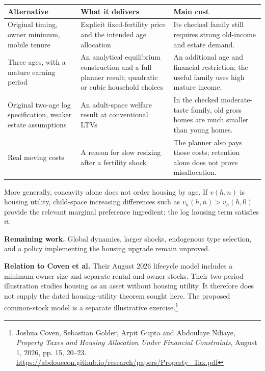 \documentclass[11pt]{article}
\begin{document}
\small
\begin{tabular}{p{}p{}p{}}
\toprule
Alternative & What it delivers & Main cost \\
\midrule
Original timing, owner minimum, mobile tenure
& Explicit fixed-fertility price and the intended age allocation
& Its checked family still requires strong old-income and estate demand. \\[6pt]
Three ages, with a mature earning period
& An analytical equilibrium construction and a full planner result; quadratic or cubic household choices
& An additional age and financial restriction; the useful family uses high mature income. \\[6pt]
Original two-age log specification, weaker estate assumptions
& An adult-space welfare result at conventional LTVs
& In the checked moderate-taste family, old gross homes are much smaller than young homes. \\[6pt]
Real moving costs
& A reason for slow resizing after a fertility shock
& The planner also pays those costs; retention alone does not prove misallocation. \\
\bottomrule
\end{tabular}
\normalsize

More generally, concavity alone does not order housing by age. If $v(h,n)$ is
housing utility, child-space increasing differences such as
$v_h(h,n)>v_h(h,0)$ provide the relevant marginal preference ingredient; the log
housing term satisfies it.

\textbf{Remaining work.} Global dynamics, larger shocks, endogenous type
selection, and a policy implementing the housing upgrade remain unproved.

\textbf{Relation to Coven et al.}
Their August 2026 lifecycle model includes a minimum owner size and separate
rental and owner stocks. Their two-period illustration studies housing as an
asset without housing utility. It therefore does not supply the dated
housing-utility theorem sought here. The proposed common-stock model is a
separate illustrative exercise.\footnote{Joshua Coven, Sebastian Golder,
Arpit Gupta and Abdoulaye Ndiaye, \emph{Property Taxes and Housing Allocation
Under Financial Constraints}, August 1, 2026, pp. 15, 20--23.
\url{https://abdouecon.github.io/research/papers/Property_Tax.pdf}}
\end{document}
